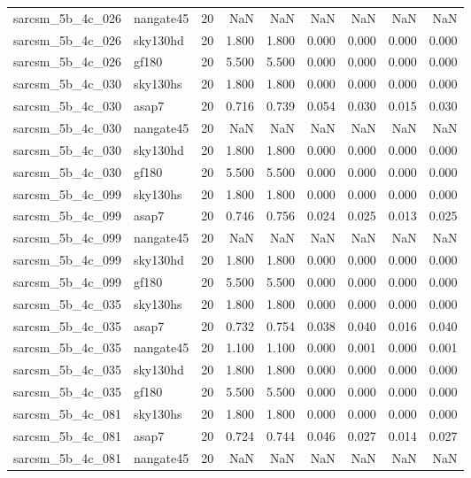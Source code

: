 \begin{tabular}{llrrrrrrr}
sarcsm\_5b\_4c\_026 & nangate45 & 20 & NaN & NaN & NaN & NaN & NaN & NaN \\
sarcsm\_5b\_4c\_026 & sky130hd & 20 & 1.800 & 1.800 & 0.000 & 0.000 & 0.000 & 0.000 \\
sarcsm\_5b\_4c\_026 & gf180 & 20 & 5.500 & 5.500 & 0.000 & 0.000 & 0.000 & 0.000 \\
sarcsm\_5b\_4c\_030 & sky130hs & 20 & 1.800 & 1.800 & 0.000 & 0.000 & 0.000 & 0.000 \\
sarcsm\_5b\_4c\_030 & asap7 & 20 & 0.716 & 0.739 & 0.054 & 0.030 & 0.015 & 0.030 \\
sarcsm\_5b\_4c\_030 & nangate45 & 20 & NaN & NaN & NaN & NaN & NaN & NaN \\
sarcsm\_5b\_4c\_030 & sky130hd & 20 & 1.800 & 1.800 & 0.000 & 0.000 & 0.000 & 0.000 \\
sarcsm\_5b\_4c\_030 & gf180 & 20 & 5.500 & 5.500 & 0.000 & 0.000 & 0.000 & 0.000 \\
sarcsm\_5b\_4c\_099 & sky130hs & 20 & 1.800 & 1.800 & 0.000 & 0.000 & 0.000 & 0.000 \\
sarcsm\_5b\_4c\_099 & asap7 & 20 & 0.746 & 0.756 & 0.024 & 0.025 & 0.013 & 0.025 \\
sarcsm\_5b\_4c\_099 & nangate45 & 20 & NaN & NaN & NaN & NaN & NaN & NaN \\
sarcsm\_5b\_4c\_099 & sky130hd & 20 & 1.800 & 1.800 & 0.000 & 0.000 & 0.000 & 0.000 \\
sarcsm\_5b\_4c\_099 & gf180 & 20 & 5.500 & 5.500 & 0.000 & 0.000 & 0.000 & 0.000 \\
sarcsm\_5b\_4c\_035 & sky130hs & 20 & 1.800 & 1.800 & 0.000 & 0.000 & 0.000 & 0.000 \\
sarcsm\_5b\_4c\_035 & asap7 & 20 & 0.732 & 0.754 & 0.038 & 0.040 & 0.016 & 0.040 \\
sarcsm\_5b\_4c\_035 & nangate45 & 20 & 1.100 & 1.100 & 0.000 & 0.001 & 0.000 & 0.001 \\
sarcsm\_5b\_4c\_035 & sky130hd & 20 & 1.800 & 1.800 & 0.000 & 0.000 & 0.000 & 0.000 \\
sarcsm\_5b\_4c\_035 & gf180 & 20 & 5.500 & 5.500 & 0.000 & 0.000 & 0.000 & 0.000 \\
sarcsm\_5b\_4c\_081 & sky130hs & 20 & 1.800 & 1.800 & 0.000 & 0.000 & 0.000 & 0.000 \\
sarcsm\_5b\_4c\_081 & asap7 & 20 & 0.724 & 0.744 & 0.046 & 0.027 & 0.014 & 0.027 \\
sarcsm\_5b\_4c\_081 & nangate45 & 20 & NaN & NaN & NaN & NaN & NaN & NaN \\

\end{tabular}
